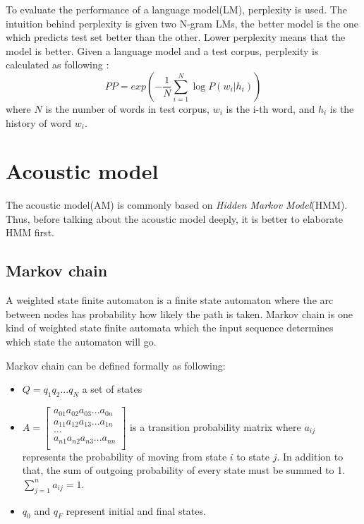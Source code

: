 To evaluate the performance of a language model(LM), perplexity is used. The intuition behind perplexity is given two N-gram LMs, the better model is the one which predicts test set better than the other. Lower perplexity means that the model is better. Given a language model and a test corpus, perplexity is calculated as following \cite{Bahl:1983:MLA:2053027.2053281, Klakow:2002:TCW:638078.638080}:
\begin{equation}
PP = exp(-\frac{1}{N} \sum^{N}_{i=1} \log P(w_{i}|h_{i}))
\end{equation}
where $N$ is the number of words in test corpus, $w_{i}$ is the i-th word, and $h_{i}$ is the history of word $w_{i}$.


\section{Acoustic model}
The acoustic model(AM) is commonly based on \textit{Hidden Markov Model}(HMM). Thus, before talking about the acoustic model deeply, it is better to elaborate HMM first. 


\subsection{Markov chain}
A weighted state finite automaton is a finite state automaton where the arc between nodes has probability how likely the path is taken. Markov chain is one kind of weighted state finite automata which the input sequence determines which state the automaton will go.

Markov chain can be defined formally as following:
\begin{itemize}
\item $Q=q_{1}q_{2}...q_{N}$ a set of states
\item  $A=
\begin{bmatrix}
a_{01}a_{02}a_{03}...a_{0n} \\
a_{11}a_{12}a_{13}...a_{1n} \\
... \\
a_{n1}a_{n2}a_{n3}...a_{nn} \\
\end{bmatrix}
$ is a transition probability matrix where $a_{ij}$ represents the probability of moving from state $i$ to state $j$. In addition to that, the sum of outgoing probability of every state must be summed to 1. $\sum_{j=1}^{n}  a_{ij}=1$. 
\item $q_{0}$ and $q_{F}$ represent initial and final states.
\end{itemize}

